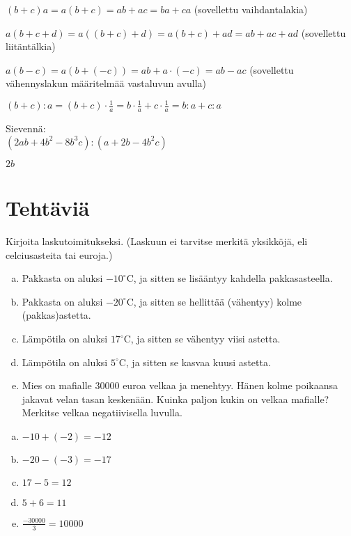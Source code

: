 $(b+c)a = a(b+c) = ab+ac = ba+ca$ (sovellettu vaihdantalakia)

$a(b+c+d) = a((b+c)+d) = a(b+c)+ad = ab+ac+ad$ (sovellettu liitäntälkia)

$a(b-c) = a(b+(-c))=ab+a\cdot(-c)=ab-ac$ (sovellettu vähennyslakun määritelmää vastaluvun avulla)

$(b+c):a = (b+c)\cdot\frac1a = b\cdot\frac1a+c\cdot\frac1a = b:a+c:a$

\begin{tehtava}
Sievennä: \\
$(2ab+4b^2-8b^3c):(a+2b-4b^2c)$
	\begin{vastaus}
	$2b$
	\end{vastaus}
\end{tehtava}
    

    \section*{Tehtäviä}
    
    
        \begin{tehtava}
        Kirjoita laskutoimitukseksi. (Laskuun ei tarvitse merkitä yksikköjä, eli celciusasteita tai euroja.)


        \begin{enumerate}[a)]
            \item Pakkasta on aluksi $-10 ^{\circ}$C, ja sitten se lisääntyy kahdella pakkasasteella.
            \item Pakkasta on aluksi $-20 ^{\circ}$C, ja sitten se hellittää (vähentyy) kolme (pakkas)astetta.
            \item Lämpötila on aluksi $17 ^{\circ}$C, ja sitten se vähentyy viisi astetta.
            \item Lämpötila on aluksi $5 ^{\circ}$C, ja sitten se kasvaa kuusi astetta.
            \item Mies on mafialle $30 000$ euroa velkaa ja menehtyy. Hänen kolme
                poikaansa jakavat velan tasan keskenään. Kuinka paljon kukin on
                velkaa mafialle? Merkitse velkaa negatiivisella luvulla.
        \end{enumerate}
        
        \begin{vastaus}
            \begin{enumerate}[a)]
                \item $-10+(-2)=-12$
                \item $-20-(-3)=-17$
                \item $17-5=12$
                \item $5+6=11$
                \item $\frac{-30 000}{3}=10 000$
            \end{enumerate}
        \end{vastaus}
    \end{tehtava}
    
